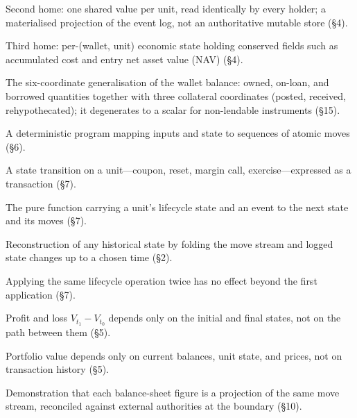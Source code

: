 \begin{description}[style=nextline,leftmargin=1.5em,itemsep=3pt]
\item[\textbf{UnitStatus}] Second home: one shared value per unit, read identically by
every holder; a materialised projection of the event log, not an authoritative mutable
store (\S4).

\item[\textbf{PositionState}] Third home: per-(wallet, unit) economic state holding
conserved fields such as accumulated cost and entry net asset value (NAV) (\S4).

\item[\textbf{Position vector}] The six-coordinate generalisation of the wallet balance:
owned, on-loan, and borrowed quantities together with three collateral coordinates (posted,
received, rehypothecated); it degenerates to a scalar for non-lendable instruments (\S15).

\item[\textbf{Smart contract (move generator)}] A deterministic program mapping inputs and
state to sequences of atomic moves (\S6).

\item[\textbf{Lifecycle event}] A state transition on a unit---coupon, reset, margin call,
exercise---expressed as a transaction (\S7).

\item[\textbf{Transition function}] The pure function carrying a unit's lifecycle state and
an event to the next state and its moves (\S7).

\item[\textbf{Replay}] Reconstruction of any historical state by folding the move stream
and logged state changes up to a chosen time (\S2).

\item[\textbf{Idempotence}] Applying the same lifecycle operation twice has no effect beyond
the first application (\S7).

\item[\textbf{Path-independent PnL}] Profit and loss $V_{t_1}-V_{t_0}$ depends only on the
initial and final states, not on the path between them (\S5).

\item[\textbf{State-sufficiency}] Portfolio value depends only on current balances, unit
state, and prices, not on transaction history (\S5).

\item[\textbf{Balance-sheet substantiation}] Demonstration that each balance-sheet figure
is a projection of the same move stream, reconciled against external authorities at the
boundary (\S10).


\end{description}
